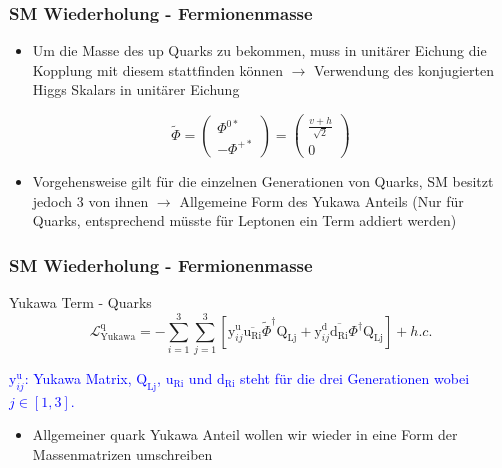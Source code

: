 \documentclass[xcolor=dvipsnames]{beamer}
\begin{document}
\begin{frame}
\frametitle{SM Wiederholung - Fermionenmasse}
\begin{itemize}
\item Um die Masse des up Quarks zu bekommen, muss in unitärer Eichung die Kopplung mit diesem stattfinden können $\rightarrow$ Verwendung des konjugierten Higgs Skalars in unitärer Eichung
\end{itemize}
 \begin{equation*}
 \tilde{\Phi}=\left( \begin{array}{c} \Phi^{0*}\\ -\Phi^{+*} \end{array}\right)=\left( \begin{array}{c}  \frac{v+h}{\sqrt{2}}\\ 0 \end{array}\right)
 \end{equation*}
 \begin{itemize}
\item Vorgehensweise gilt für die einzelnen Generationen von Quarks, SM besitzt jedoch 3 von ihnen $\rightarrow$ Allgemeine Form des Yukawa Anteils (Nur für Quarks, entsprechend müsste für Leptonen ein Term addiert werden)
\end{itemize}

\end{frame}

\begin{frame}[t]
\frametitle{SM Wiederholung - Fermionenmasse}
\begin{block}{Yukawa Term - Quarks}
\begin{equation*}
\mathscr{L}_{\text{Yukawa}}^{\text{q}}=- \sum_{i=1}^{3} \sum_{j=1}^{3} [\text{y}^{\text{u}}_{ij}\overline{\text{u}_{\text{Ri}}} \tilde{\Phi}^{\dagger}\text{Q}_{\text{Lj}}+\text{y}^{\text{d}}_{ij} \overline{\text{d}_{\text{Ri}}}\Phi^{\dagger} \text{Q}_{\text{Lj}}]+h.c.
\end{equation*}
\end{block}
\textcolor{Blue}{$\text{y}^{\text{u}}_{ij}$: Yukawa Matrix, $\text{Q}_{\text{Lj}}$, $\text{u}_{\text{Ri}}$ und $\text{d}_{\text{Ri}}$ steht für die drei Generationen wobei $j \in [1,3]$.}

\begin{itemize}
\item Allgemeiner quark Yukawa Anteil wollen wir wieder in eine Form der Massenmatrizen umschreiben
\end{itemize}
\end{frame}
\end{document}
